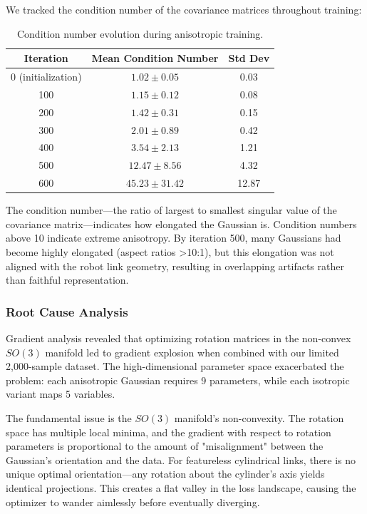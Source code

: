 \documentclass[12pt,a4paper,oneside]{report}
\begin{document}
We tracked the condition number of the covariance matrices throughout training:

\begin{table}[H]
\centering
\caption{Condition number evolution during anisotropic training.}
\label{tab:condition_number}
\begin{tabular}{ccc}
\toprule
Iteration & Mean Condition Number & Std Dev \\
\midrule
0 (initialization) & $1.02 \pm 0.05$ & 0.03 \\
100 & $1.15 \pm 0.12$ & 0.08 \\
200 & $1.42 \pm 0.31$ & 0.15 \\
300 & $2.01 \pm 0.89$ & 0.42 \\
400 & $3.54 \pm 2.13$ & 1.21 \\
500 & $12.47 \pm 8.56$ & 4.32 \\
600 & $45.23 \pm 31.42$ & 12.87 \\
\bottomrule
\end{tabular}
\end{table}

The condition number---the ratio of largest to smallest singular value of the covariance matrix---indicates how elongated the Gaussian is. Condition numbers above 10 indicate extreme anisotropy. By iteration 500, many Gaussians had become highly elongated (aspect ratios >10:1), but this elongation was not aligned with the robot link geometry, resulting in overlapping artifacts rather than faithful representation.

\subsubsection{Root Cause Analysis}

Gradient analysis revealed that optimizing rotation matrices in the non-convex $SO(3)$ manifold led to gradient explosion when combined with our limited 2,000-sample dataset. The high-dimensional parameter space exacerbated the problem: each anisotropic Gaussian requires 9 parameters, while each isotropic variant maps 5 variables.

The fundamental issue is the $SO(3)$ manifold's non-convexity. The rotation space has multiple local minima, and the gradient with respect to rotation parameters is proportional to the amount of "misalignment" between the Gaussian's orientation and the data. For featureless cylindrical links, there is no unique optimal orientation---any rotation about the cylinder's axis yields identical projections. This creates a flat valley in the loss landscape, causing the optimizer to wander aimlessly before eventually diverging.
\end{document}
